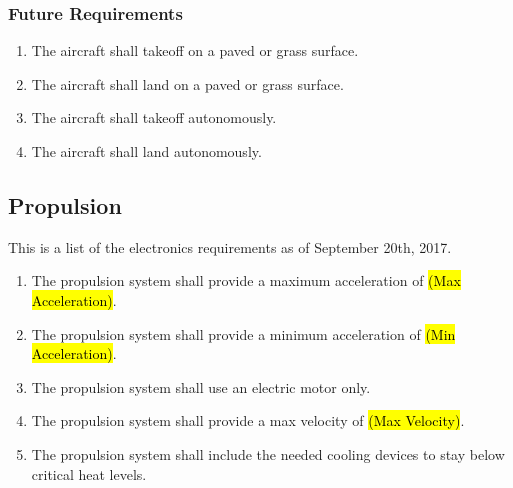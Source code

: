 \documentclass{article}
\begin{document}
\subsubsection{Future Requirements}
\begin{enumerate}
  \item{The aircraft shall takeoff on a paved or grass surface.}
  \item{The aircraft shall land on a paved or grass surface. }
  \item{The aircraft shall takeoff autonomously.}
  \item{The aircraft shall land autonomously.}

\end{enumerate}

\subsection{Propulsion}
This is a list of the electronics requirements as of September 20th, 2017.
\begin{enumerate}
  \item{The propulsion system shall provide a maximum acceleration of \hl{(Max Acceleration)}.}
  \item{The propulsion system shall provide a minimum acceleration of \hl{(Min Acceleration)}.}
  \item{The propulsion system shall use an electric motor only.}
  \item{The propulsion system shall provide a max velocity of \hl{(Max Velocity)}.}
  \item{The propulsion system shall include the needed cooling devices to stay below critical heat levels.}

\end{enumerate}
\end{document}
